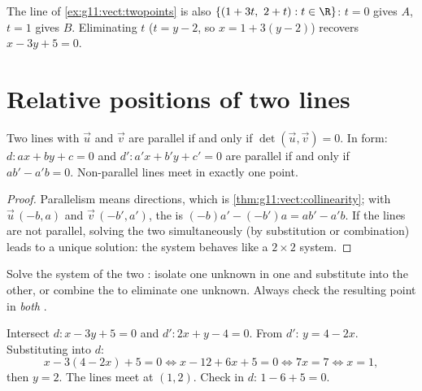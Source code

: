 \begin{example}
The line of \cref{ex:g11:vect:twopoints} is also
$\{(1 + 3t,\ 2 + t) : t \in \R\}$: $t = 0$ gives $A$, $t = 1$ gives $B$.
Eliminating $t$ ($t = y - 2$, so $x = 1 + 3(y-2)$) recovers
$x - 3y + 5 = 0$.
\end{example}

\section{Relative positions of two lines}

\begin{proposition}\label{prop:g11:vect:positions}
Two lines with  $\vec u$ and $\vec v$ are parallel if and
only if $\det(\vec u, \vec v) = 0$. In  form: $d : ax + by + c =
0$ and $d' : a'x + b'y + c' = 0$ are parallel if and only if
$ab' - a'b = 0$. Non-parallel lines meet in exactly one point.
\end{proposition}

\begin{proof}
Parallelism means  directions, which is
\cref{thm:g11:vect:collinearity}; with $\vec u\,(-b, a)$ and
$\vec v\,(-b', a')$, the  is $(-b)a' - (-b')a = ab' - a'b$.
If the lines are not parallel, solving the two  simultaneously
(by substitution or combination) leads to a unique solution: the system
behaves like a  $2 \times 2$ system.
\end{proof}

\begin{method}\label{met:g11:vect:intersection}
Solve the system of the two : isolate one unknown in one 
and substitute into the other, or combine the  to eliminate one
unknown. Always check the resulting point in \emph{both} .
\end{method}

\begin{example}\label{ex:g11:vect:intersection}
Intersect $d: x - 3y + 5 = 0$ and $d': 2x + y - 4 = 0$. From $d'$:
$y = 4 - 2x$. Substituting into $d$:
\[
x - 3(4 - 2x) + 5 = 0
\iff x - 12 + 6x + 5 = 0
\iff 7x = 7
\iff x = 1,
\]
then $y = 2$. The lines meet at $(1, 2)$. Check in $d$: $1 - 6 + 5 = 0$.
\end{example}

